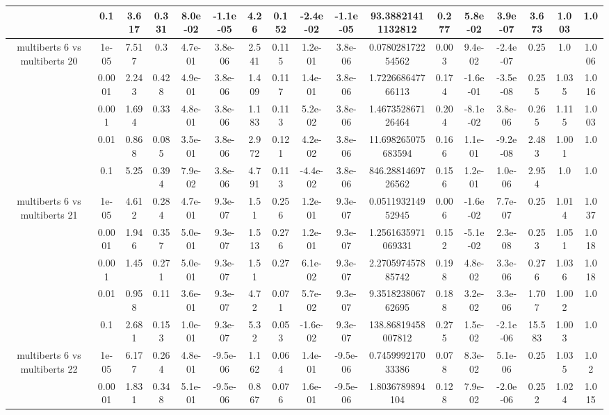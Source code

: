 \begin{tabular}{|c|c|c|c|c|c|c|c|c|c|c|c|c|c|c|c|c|}
 & 0.1 & 3.617 & 0.331 & 8.0e-02 & -1.1e-05 & 4.26 & 0.152 & -2.4e-02 & -1.1e-05 & 93.38821411132812 & 0.277 & 5.8e-02 & 3.9e-07 & 3.673 & 1.003 & 1.0 \\
\hline
\multirow{5}{*}{multiberts 6 vs multiberts 20} & 1e-05 & 7.517 & 0.3 & 4.7e-01 & 3.8e-06 & 2.541 & 0.115 & 1.2e-01 & 3.8e-06 & 0.078028172254562 & 0.003 & 9.4e-02 & -2.4e-07 & 0.25 & 1.0 & 1.006 \\
 & 0.0001 & 2.243 & 0.428 & 4.9e-01 & 3.8e-06 & 1.409 & 0.117 & 1.4e-01 & 3.8e-06 & 1.722668647766113 & 0.174 & -1.6e-01 & -3.5e-08 & 0.255 & 1.035 & 1.016 \\
 & 0.001 & 1.694 & 0.33 & 4.8e-01 & 3.8e-06 & 1.183 & 0.113 & 5.2e-02 & 3.8e-06 & 1.467352867126464 & 0.204 & -8.1e-02 & 3.8e-06 & 0.265 & 1.115 & 1.003 \\
 & 0.01 & 0.868 & 0.085 & 3.5e-01 & 3.8e-06 & 2.972 & 0.121 & 4.2e-02 & 3.8e-06 & 11.698265075683594 & 0.166 & 1.1e-01 & -9.2e-08 & 2.483 & 1.001 & 1.0 \\
 & 0.1 & 5.25 & 0.394 & 7.9e-02 & 3.8e-06 & 4.791 & 0.113 & -4.4e-02 & 3.8e-06 & 846.2881469726562 & 0.156 & 1.2e-01 & 1.0e-06 & 2.954 & 1.0 & 1.0 \\
\hline
\multirow{5}{*}{multiberts 6 vs multiberts 21} & 1e-05 & 4.612 & 0.284 & 4.7e-01 & 9.3e-07 & 1.51 & 0.256 & 1.2e-01 & 9.3e-07 & 0.051193214952945 & 0.006 & -1.6e-02 & 7.7e-07 & 0.25 & 1.014 & 1.037 \\
 & 0.0001 & 1.946 & 0.357 & 5.0e-01 & 9.3e-07 & 1.513 & 0.276 & 1.2e-01 & 9.3e-07 & 1.2561635971069331 & 0.152 & -5.1e-02 & 2.3e-08 & 0.253 & 1.051 & 1.018 \\
 & 0.001 & 1.45 & 0.271 & 5.0e-01 & 9.3e-07 & 1.51 & 0.27 & 6.1e-02 & 9.3e-07 & 2.270597457885742 & 0.198 & 4.8e-02 & 3.3e-06 & 0.276 & 1.036 & 1.018 \\
 & 0.01 & 0.958 & 0.11 & 3.6e-01 & 9.3e-07 & 4.72 & 0.071 & 5.7e-02 & 9.3e-07 & 9.351823806762695 & 0.188 & 3.2e-02 & 3.3e-06 & 1.707 & 1.002 & 1.0 \\
 & 0.1 & 2.681 & 0.153 & 1.0e-01 & 9.3e-07 & 5.32 & 0.053 & -1.6e-02 & 9.3e-07 & 138.86819458007812 & 0.275 & 1.5e-02 & -2.1e-06 & 15.583 & 1.003 & 1.0 \\
\hline
\multirow{5}{*}{multiberts 6 vs multiberts 22} & 1e-05 & 6.177 & 0.264 & 4.8e-01 & -9.5e-06 & 1.162 & 0.064 & 1.4e-01 & -9.5e-06 & 0.745999217033386 & 0.078 & 8.3e-02 & 5.1e-06 & 0.25 & 1.035 & 1.02 \\
 & 0.0001 & 1.831 & 0.348 & 5.1e-01 & -9.5e-06 & 0.867 & 0.076 & 1.6e-01 & -9.5e-06 & 1.8036789894104 & 0.128 & 7.9e-02 & -2.0e-06 & 0.252 & 1.024 & 1.015 \\

\end{tabular}
